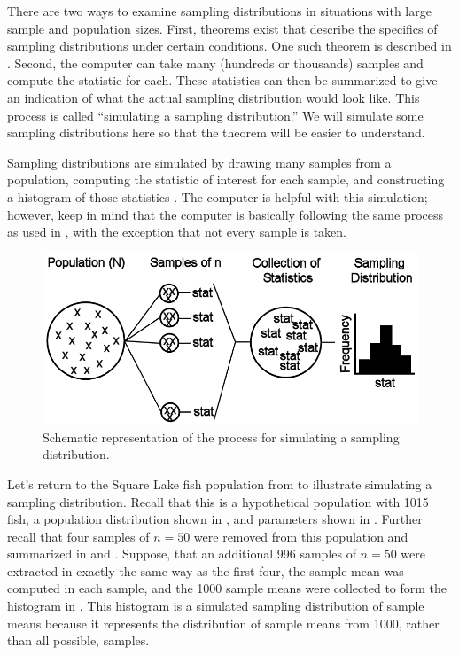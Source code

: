 \documentclass[10pt,openany]{book}\usepackage[]{graphicx}\usepackage[]{color}
\begin{document}
There are two ways to examine sampling distributions in situations with large sample and population sizes. First, theorems exist that describe the specifics of sampling distributions under certain conditions. One such theorem is described in . Second, the computer can take many (hundreds or thousands) samples and compute the statistic for each. These statistics can then be summarized to give an indication of what the actual sampling distribution would look like. This process is called ``simulating a sampling distribution.'' We will simulate some sampling distributions here so that the theorem will be easier to understand.

Sampling distributions are simulated by drawing many samples from a population, computing the statistic of interest for each sample, and constructing a histogram of those statistics . The computer is helpful with this simulation; however, keep in mind that the computer is basically following the same process as used in , with the exception that not every sample is taken.

\begin{figure}[htbp]
  \centering
    \includegraphics[width=4.75in]{Figs/Sampling_Distribution_Scheme.png}
  \caption{Schematic representation of the process for simulating a sampling distribution.}
  \label{fig:SamplingDistributionScheme}
\end{figure}

Let's return to the Square Lake fish population from  to illustrate simulating a sampling distribution. Recall that this is a hypothetical population with 1015 fish, a population distribution shown in , and parameters shown in . Further recall that four samples of $n=50$ were removed from this population and summarized in  and . Suppose, that an additional 996 samples of $n=50$ were extracted in exactly the same way as the first four, the sample mean was computed in each sample, and the 1000 sample means were collected to form the histogram in . This histogram is a simulated sampling distribution of sample means because it represents the distribution of sample means from 1000, rather than all possible, samples.
\end{document}
